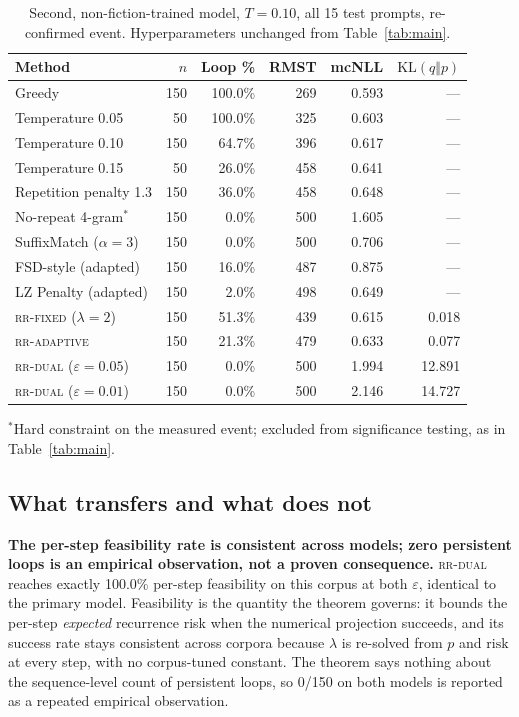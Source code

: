 \documentclass[make,article,submit,pdftex]{Definitions/mdpi}
\providecommand{\KL}{}\renewcommand{\KL}{\mathrm{KL}}
\newcommand{\risk}{\mathrm{risk}}
\begin{document}
\begin{table}[H]
\centering
\caption{Second, non-fiction-trained model, $T{=}0.10$, all 15 test prompts, re-confirmed event. Hyperparameters unchanged from Table~\ref{tab:main}.}
\label{tab:generalization}
\begin{tabular}{@{}lrrrrr@{}}
\toprule
Method & $n$ & Loop \% & RMST & mcNLL & $\KL(q\Vert p)$ \\
\midrule
Greedy                      & 150 & 100.0\% & 269   & 0.593 & --- \\
Temperature 0.05             & 50  & 100.0\% & 325   & 0.603 & --- \\
Temperature 0.10             & 150 & 64.7\%  & 396   & 0.617 & --- \\
Temperature 0.15             & 50  & 26.0\%  & 458   & 0.641 & --- \\
Repetition penalty 1.3        & 150 & 36.0\%  & 458   & 0.648 & --- \\
No-repeat 4-gram$^{*}$       & 150 & 0.0\%   & 500   & 1.605 & --- \\
SuffixMatch ($\alpha{=}3$)    & 150 & 0.0\%   & 500   & 0.706 & --- \\
FSD-style (adapted)          & 150 & 16.0\%  & 487   & 0.875 & --- \\
LZ Penalty (adapted)        & 150 & 2.0\%   & 498   & 0.649 & --- \\
\textsc{rr-fixed} ($\lambda{=}2$)   & 150 & 51.3\%  & 439   & 0.615 & 0.018 \\
\textsc{rr-adaptive}          & 150 & 21.3\%  & 479   & 0.633 & 0.077 \\
\textsc{rr-dual} ($\varepsilon{=}0.05$) & 150 & 0.0\% & 500 & 1.994 & 12.891 \\
\textsc{rr-dual} ($\varepsilon{=}0.01$) & 150 & 0.0\% & 500 & 2.146 & 14.727 \\
\bottomrule
\end{tabular}

\vspace{4pt}
{\footnotesize $^{*}$Hard constraint on the measured event; excluded from significance testing, as in Table~\ref{tab:main}.}
\end{table}


\subsection{What transfers and what does not}
\textbf{The per-step feasibility rate is consistent across models; zero persistent loops is an empirical observation, not a proven consequence.} \textsc{rr-dual} reaches exactly 100.0\% per-step feasibility on this corpus at both $\varepsilon$, identical to the primary model. Feasibility is the quantity the theorem governs: it bounds the per-step \emph{expected} recurrence risk when the numerical projection succeeds, and its success rate stays consistent across corpora because $\lambda$ is re-solved from $p$ and $\risk$ at every step, with no corpus-tuned constant. The theorem says nothing about the sequence-level count of persistent loops, so 0/150 on both models is reported as a repeated empirical observation.
\end{document}
